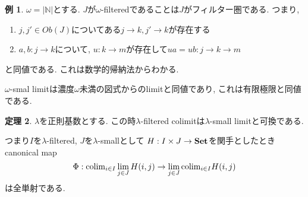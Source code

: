 \documentclass[dvipdfmx,a4paper,11pt]{article}
\newcommand{\N}{\mathbb{N}}
\newcommand{\colim}{{\rm colim}}
\theoremstyle{definition}
\newtheorem{thm}{定理}
\newtheorem{exa}[thm]{例}
\newcommand{\xr}[1]{\textcolor{red}{#1}}
\begin{document}
\begin{exa}
$\omega = |\N|$とする.
$J$が$\omega$-filteredであることは$J$がフィルター圏である. つまり, 
\begin{enumerate}
\item $j, j' \in Ob(J)$についてある$j \to k, j' \to k$が存在する
\item $a, b: j \to k$について, $u: k \to m$が存在して$ua = ub : j \to k \to m$
\end{enumerate}
と同値である.
これは数学的帰納法からわかる.

$\omega$-smal limitは濃度$\omega$未満の図式からのlimitと同値であり, これは有限極限と同値である. 

\end{exa}

 \begin{tcolorbox}
 [colback = white, colframe = green!35!black, fonttitle = \bfseries,breakable = true]
\begin{thm}
\label{thm-regular-commute}
$\lambda$を正則基数とする. 
この時$\lambda$-filtered colimitは$\lambda$-small limitと可換である.

つまり$I$を$\lambda$-filtered, $J$を$\lambda$-smallとして
$H : I \times J \to {\bf Set}$を関手としたとき
canonical map
$$
\Phi: \colim_{i \in I} \lim_{j \in J}H(i,j)
\to
\lim_{j \in J}
\colim_{i \in I} H(i,j)
$$
は全単射である. 
\end{thm}
 \end{tcolorbox}
\end{document}
